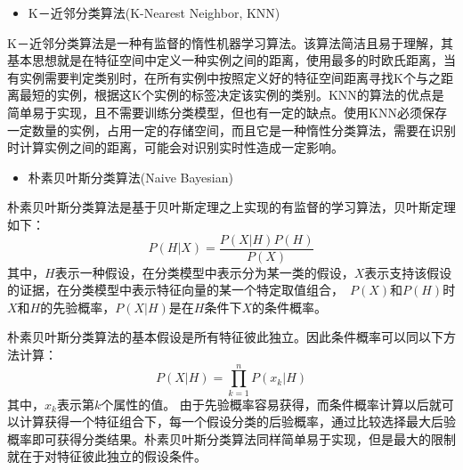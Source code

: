 \begin{itemize}
	\item K－近邻分类算法(K-Nearest Neighbor, KNN)
\end{itemize}
\par K－近邻分类算法是一种有监督的惰性机器学习算法。该算法简洁且易于理解，其基本思想就是在特征空间中定义一种实例之间的距离，使用最多的时欧氏距离，当有实例需要判定类别时，在所有实例中按照定义好的特征空间距离寻找K个与之距离最短的实例，根据这K个实例的标签决定该实例的类别。KNN的算法的优点是简单易于实现，且不需要训练分类模型，但也有一定的缺点。使用KNN必须保存一定数量的实例，占用一定的存储空间，而且它是一种惰性分类算法，需要在识别时计算实例之间的距离，可能会对识别实时性造成一定影响。
\begin{itemize}
	\item 朴素贝叶斯分类算法(Naive Bayesian)
\end{itemize}
\par 朴素贝叶斯分类算法是基于贝叶斯定理之上实现的有监督的学习算法，贝叶斯定理如下：
\begin{equation}
	P(H|X) = \frac{P(X|H)P(H)}{P(X)}
\end{equation}
其中，$H$表示一种假设，在分类模型中表示分为某一类的假设，$X$表示支持该假设的证据，在分类模型中表示特征向量的某一个特定取值组合，　$P(X)$和$P(H)$时$X$和$H$的先验概率，$P(X|H)$是在$H$条件下$X$的条件概率。
\par 朴素贝叶斯分类算法的基本假设是所有特征彼此独立。因此条件概率可以同以下方法计算：
\begin{equation}
	P(X|H) = \prod_{k=1}^{n}P(x_k|H)
\end{equation}
其中，$x_k$表示第$k$个属性的值。
由于先验概率容易获得，而条件概率计算以后就可以计算获得一个特征组合下，每一个假设分类的后验概率，通过比较选择最大后验概率即可获得分类结果。朴素贝叶斯分类算法同样简单易于实现，但是最大的限制就在于对特征彼此独立的假设条件。

